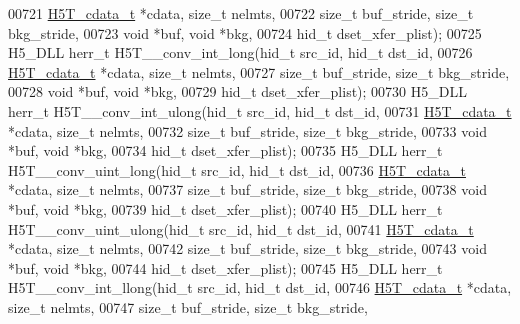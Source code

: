 \begin{DoxyCode}
00721                  \hyperlink{struct_h5_t__cdata__t}{H5T\_cdata\_t} *cdata, \textcolor{keywordtype}{size\_t} nelmts,
00722                  \textcolor{keywordtype}{size\_t} buf\_stride, \textcolor{keywordtype}{size\_t} bkg\_stride,
00723                                  \textcolor{keywordtype}{void} *buf, \textcolor{keywordtype}{void} *bkg,
00724                                  hid\_t dset\_xfer\_plist);
00725 H5\_DLL herr\_t H5T\_\_conv\_int\_long(hid\_t src\_id, hid\_t dst\_id,
00726                  \hyperlink{struct_h5_t__cdata__t}{H5T\_cdata\_t} *cdata, \textcolor{keywordtype}{size\_t} nelmts,
00727                  \textcolor{keywordtype}{size\_t} buf\_stride, \textcolor{keywordtype}{size\_t} bkg\_stride,
00728                                  \textcolor{keywordtype}{void} *buf, \textcolor{keywordtype}{void} *bkg,
00729                                  hid\_t dset\_xfer\_plist);
00730 H5\_DLL herr\_t H5T\_\_conv\_int\_ulong(hid\_t src\_id, hid\_t dst\_id,
00731                   \hyperlink{struct_h5_t__cdata__t}{H5T\_cdata\_t} *cdata, \textcolor{keywordtype}{size\_t} nelmts,
00732                   \textcolor{keywordtype}{size\_t} buf\_stride, \textcolor{keywordtype}{size\_t} bkg\_stride,
00733                                   \textcolor{keywordtype}{void} *buf, \textcolor{keywordtype}{void} *bkg,
00734                                   hid\_t dset\_xfer\_plist);
00735 H5\_DLL herr\_t H5T\_\_conv\_uint\_long(hid\_t src\_id, hid\_t dst\_id,
00736                   \hyperlink{struct_h5_t__cdata__t}{H5T\_cdata\_t} *cdata, \textcolor{keywordtype}{size\_t} nelmts,
00737                   \textcolor{keywordtype}{size\_t} buf\_stride, \textcolor{keywordtype}{size\_t} bkg\_stride,
00738                                   \textcolor{keywordtype}{void} *buf, \textcolor{keywordtype}{void} *bkg,
00739                                   hid\_t dset\_xfer\_plist);
00740 H5\_DLL herr\_t H5T\_\_conv\_uint\_ulong(hid\_t src\_id, hid\_t dst\_id,
00741                    \hyperlink{struct_h5_t__cdata__t}{H5T\_cdata\_t} *cdata, \textcolor{keywordtype}{size\_t} nelmts,
00742                    \textcolor{keywordtype}{size\_t} buf\_stride, \textcolor{keywordtype}{size\_t} bkg\_stride,
00743                                    \textcolor{keywordtype}{void} *buf, \textcolor{keywordtype}{void} *bkg,
00744                                    hid\_t dset\_xfer\_plist);
00745 H5\_DLL herr\_t H5T\_\_conv\_int\_llong(hid\_t src\_id, hid\_t dst\_id,
00746                   \hyperlink{struct_h5_t__cdata__t}{H5T\_cdata\_t} *cdata, \textcolor{keywordtype}{size\_t} nelmts,
00747                   \textcolor{keywordtype}{size\_t} buf\_stride, \textcolor{keywordtype}{size\_t} bkg\_stride,

\end{DoxyCode}
